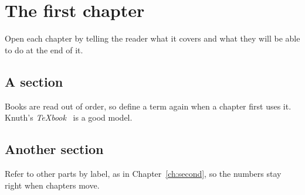\chapter{The first chapter}
\label{ch:first}

Open each chapter by telling the reader what it covers and what they will be
able to do at the end of it.

\section{A section}

Books are read out of order, so define a term again when a chapter first uses
it. Knuth's \emph{\TeX book}~\cite{knuth1984} is a good model.

\section{Another section}

Refer to other parts by label, as in Chapter~\ref{ch:second}, so the numbers
stay right when chapters move.
